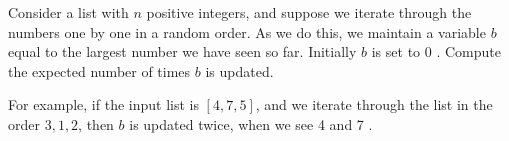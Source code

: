 \problem{}

Consider a list with $n$ positive integers, and suppose we iterate through the numbers one by one in a random order. As we do this, we maintain a variable $b$ equal to the largest number we have seen so far. Initially $b$ is set to 0 . Compute the expected number of times $b$ is updated.

For example, if the input list is $[4,7,5]$, and we iterate through the list in the order $3,1,2$, then $b$ is updated twice, when we see 4 and 7 .

\solution{}







